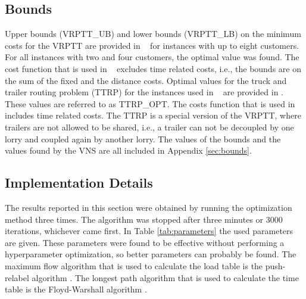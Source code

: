 \subsection{Bounds}
Upper bounds (VRPTT\_UB) and lower bounds (VRPTT\_LB)  on the minimum costs for the VRPTT are provided in ~\cite{drexl2014bandc} for instances with up to eight customers.
For all instances with two and four customers, the optimal value was found.
 The cost function that is used in ~\cite{drexl2014bandc} excludes time related costs, i.e., the bounds are on the sum of the fixed and the distance costs.
Optimal values for the truck and trailer routing problem (TTRP) for the instances used in ~\cite{drexl2014bandc} are provided in \cite{drexl2011branch}. These values are referred to as TTRP\_OPT. The costs function that is used in \cite{drexl2011branch} includes time related costs.  The TTRP is a special version of the VRPTT, where trailers are not allowed to be shared, i.e., a trailer can not be decoupled by one lorry and coupled again by another lorry.
%
The values of the bounds and the values found by the VNS are all included in Appendix \ref{sec:bounds}.


\subsection{Implementation Details }







The results reported in this section were obtained by running the optimization method three times.
The algorithm was stopped after three minutes or 3000 iterations, whichever came first.
In Table \ref{tab:parameters}  the used parameters are given.
These parameters were found to be effective without performing a hyperparameter optimization, so better parameters can probably be found.
The maximum flow algorithm that is used to calculate the load table is the push-relabel algorithm   \cite{goldberg1988new}.
The longest path algorithm that is used to calculate the time table is the Floyd-Warshall algorithm \cite{Floyd}.


